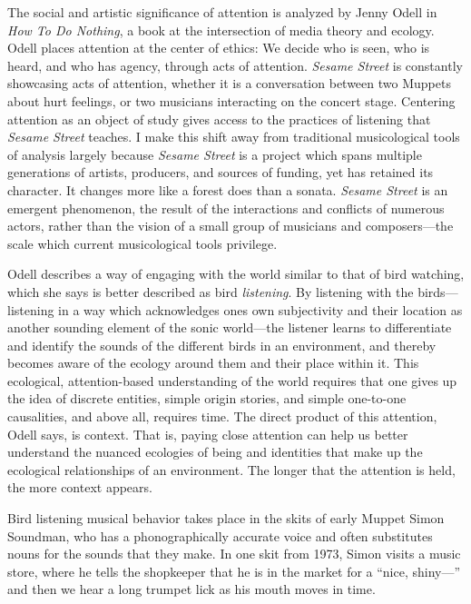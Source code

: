 \documentclass[12pt,letterpaper]{article}
\newcommand{\ses}{\textit{Sesame Street }}
\begin{document}
	The social and artistic significance of attention is analyzed by Jenny
	Odell in \textit{How To Do Nothing}, a book at the intersection of media
	theory
	and ecology. Odell places attention at the center of ethics: We decide 
	who is seen, who is heard, and who has agency, through acts of 
	attention. \autocite[154]{Odell} \ses is constantly showcasing acts of
	attention, whether it is a conversation between two Muppets about hurt
	feelings, or two musicians interacting on the concert stage. Centering 
	attention as an object of study gives access to the practices of
	listening that \ses teaches. I make this shift away from traditional
	musicological tools of analysis largely because \ses is a project which
	spans multiple generations of artists, producers, and sources of
	funding, yet has retained its character. It changes more like a forest
	does than a sonata. \ses is an emergent phenomenon, the result of the
	interactions and conflicts of numerous actors, rather than the vision
	of a small group of musicians and composers---the scale which current 
	musicological tools privilege. 

	Odell describes a way of engaging with the 
	world similar to that of bird watching, which she says is better 
	described as bird \textit{listening}.
	By listening with the birds---listening in a way which acknowledges
	ones own subjectivity and their location as another sounding element of
	the sonic world---the listener learns to differentiate and identify 
	the sounds 
	of the different birds in an environment, and thereby becomes aware
	of the ecology around them and their place within 
	it.\autocite[33/366]{Odell} 
	This ecological, attention-based understanding of the world requires 
	that one gives up the idea of discrete entities, simple origin stories,
	and simple one-to-one causalities, and above all, requires time.
	The direct product of this attention, Odell says, is context. 
	That is, paying close attention can help us better understand the 
	nuanced ecologies of being and identities that make up the ecological
	relationships of an environment. The longer that the attention is held, 
	the more context appears.\autocite[155]{Odell} 

	Bird listening musical behavior takes place in the skits of early Muppet
	Simon \mbox{Soundman,} who has a phonographically accurate voice and often
	substitutes nouns for the sounds that they make.  
	In one skit from 1973,\autocite{0458} Simon visits a music store, where
	he tells the shopkeeper
	that he is in the market for a ``nice, shiny---'' and then we hear a
	long trumpet lick as his mouth moves in time. 
\end{document}
